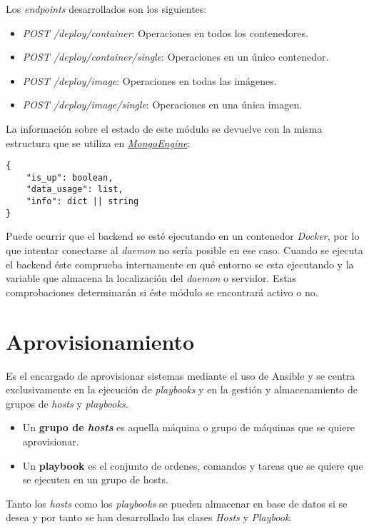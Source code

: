 \bigskip
Los \textit{endpoints} desarrollados son los siguientes:
\begin{itemize}
	\item \textit{POST /deploy/container}: Operaciones en todos los contenedores.
	\item \textit{POST /deploy/container/single}: Operaciones en un único contenedor.
	\item \textit{POST /deploy/image}: Operaciones en todas las imágenes.
	\item \textit{POST /deploy/image/single}: Operaciones en una única imagen.
\end{itemize}


\bigskip
La información sobre el estado de este módulo se devuelve con la misma estructura que se utiliza en \hyperref[sec:mongoengine]{\textit{MongoEngine}}:
\begin{lstlisting}
{
	"is_up": boolean,
	"data_usage": list,
	"info": dict || string
}
\end{lstlisting}



\bigskip
Puede ocurrir que el backend se esté ejecutando en un contenedor \textit{Docker}, por lo que intentar conectarse al \textit{daemon} no sería posible en ese caso. Cuando se ejecuta el backend éste comprueba internamente en qué entorno se esta ejecutando y la variable que almacena la localización del \textit{daemon} o servidor. Estas comprobaciones determinarán si éste módulo se encontrará activo o no.




\section{Aprovisionamiento}


Es el encargado de aprovisionar sistemas mediante el uso de Ansible y se centra exclusivamente en la ejecución de \textit{playbooks} y en la gestión y almacenamiento de grupos de \textit{hosts} y \textit{playbooks}.
\begin{itemize}
	\item Un \textbf{grupo de \textit{hosts}} es aquella máquina o grupo de máquinas que se quiere aprovisionar.
	\item Un \textbf{playbook} es el conjunto de ordenes, comandos y tareas que se quiere que se ejecuten en un grupo de hosts.
\end{itemize}

Tanto los \textit{hosts} como los \textit{playbooks} se pueden almacenar en base de datos si se desea y por tanto se han desarrollado las clases \textit{Hosts} y \textit{Playbook}.



